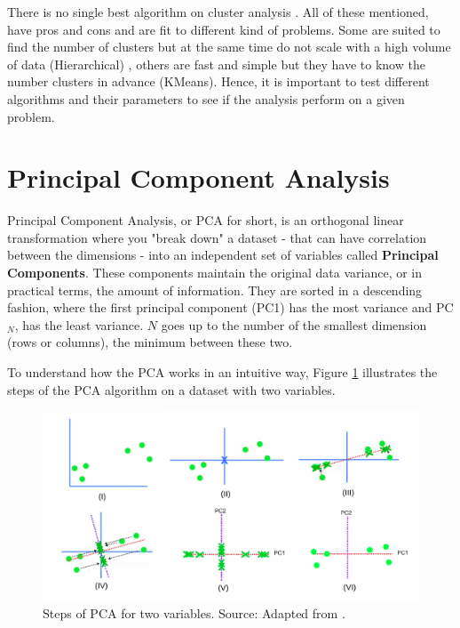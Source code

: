 There is no single best algorithm on cluster analysis \cite{james2013introduction}. All of these mentioned, have pros and cons and are fit to different kind of problems. Some are suited to find the number of clusters but at the same time do not scale with a high volume of data (Hierarchical) \cite{franti2006fast}, others are fast and simple but they have to know the number clusters in advance (KMeans). Hence, it is important to test different algorithms and their parameters to see if the analysis perform on a given problem.

\section{Principal Component Analysis}

Principal Component Analysis, or PCA for short, is an orthogonal linear transformation \cite{wikipedia_pca} where you "break down" a dataset - that can have correlation between the dimensions - into an independent set of variables called \textbf{Principal Components}. These components maintain the original data variance, or in practical terms, the amount of information. They are sorted in a descending fashion, where the first principal component (PC1) has the most variance and PC$_{N}$, has the least variance. $N$ goes up to the number of the smallest dimension (rows or columns), the minimum between these two. 

To understand how the PCA works in an intuitive way, Figure \ref{fig:pca-steps} illustrates the steps of the PCA algorithm on a dataset with two variables.

\begin{figure}[h]
   \centering
   \includegraphics[width=\linewidth]{fig/ch2-pca-steps.png}
   \caption{Steps of PCA for two variables. Source: Adapted from \cite{pcastepsyoutube}.}
   \label{fig:pca-steps}
\end{figure}


